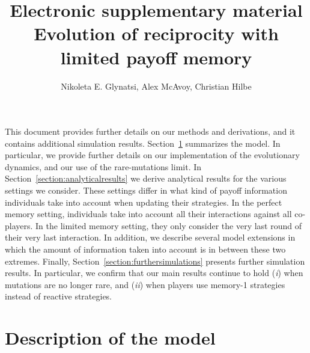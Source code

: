\documentclass[11pt]{article}
\title{{ \sffamily \LARGE Electronic supplementary material}\\{\bf \sffamily \LARGE Evolution of reciprocity with limited payoff memory}}
\date{}
\author{Nikoleta E. Glynatsi, Alex McAvoy, Christian Hilbe}
\theoremstyle{plainCl1}
\theoremstyle{plainCl2}
\begin{document}
\maketitle



\noindent
This document provides further details on our methods and derivations, and it contains additional simulation results. 
Section~\ref{section:model} summarizes the model. 
In particular, we provide further details on our implementation of the evolutionary dynamics, and our use of the rare-mutations limit. 
In Section~\ref{section:analyticalresults} we derive analytical results for the various settings we consider.
These settings differ in what kind of payoff information individuals take into account when updating their strategies. 
In the perfect memory setting, individuals take into account all their interactions against all co-players.
In the limited memory setting, they only consider the very last round of their very last interaction.  
In addition, we describe several model extensions in which the amount of information taken into account is in between these two extremes. 
Finally, Section~\ref{section:furthersimulations} presents further simulation results. 
In particular, we confirm that our main results continue to hold ({\it i}) when mutations are no longer rare, and  ({\it ii}) when players use memory-1 strategies instead of reactive strategies.




\section{Description of the model}\label{section:model}

\end{document}
